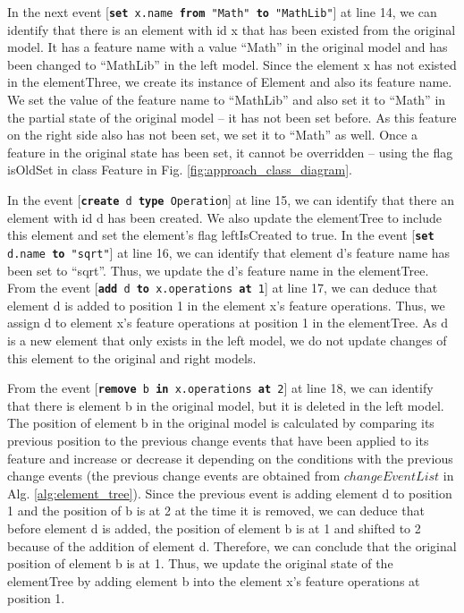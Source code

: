 \documentclass{jot}
\begin{document}
In the next event [\texttt{\small \textbf{set} x.name \textbf{from} "Math" \textbf{to} "MathLib"}] at line 14, we can identify that there is an element with id \textsf{x} that has been existed from the original model. It has a feature \textsf{name} with a value ``Math'' in the original model and has been changed to ``MathLib'' in the left model. Since the element \textsf{x} has not existed in the \textsf{elementThree}, we create its instance of \textsf{Element} and also its feature \textsf{name}. We set the value of the feature \textsf{name} to ``MathLib'' and also set it to ``Math'' in the partial state of the original model -- it has not been set before. As this feature on the right side also has not been set, we set it to ``Math'' as well. Once a feature in the original state has been set, it cannot be overridden -- using the flag \textsf{isOldSet} in class \textsf{Feature} in Fig. \ref{fig:approach_class_diagram}. 

In the event [\texttt{\small \textbf{create} d \textbf{type} Operation}] at line 15, we can identify that there an element with id \textsf{d} has been created. We also update the \textsf{elementTree} to include this element and set the element's flag \textsf{leftIsCreated} to \textsf{true}. In the event [\texttt{\small \textbf{set} d.name \textbf{to} "sqrt"}] at line 16, we can identify that element \textsf{d}'s feature \textsf{name} has been set to ``sqrt''. Thus, we update the \textsf{d}'s feature \textsf{name} in the \textsf{elementTree}. From the event [\texttt{\small \textbf{add} d \textbf{to} x.operations \textbf{at} 1}] at line 17, we can deduce that element \textsf{d} is added to position 1 in the element \textsf{x}'s feature \textsf{operations}. Thus, we assign \textsf{d} to element \textsf{x}'s feature \textsf{operations} at position 1 in the \textsf{elementTree}. As \textsf{d} is a new element that only exists in the left model, we do not update changes of this element to the original and right models. 

From the event [\texttt{\small \textbf{remove} b \textbf{in} x.operations \textbf{at} 2}] at line 18, we can identify that there is element \textsf{b} in the original model, but it is deleted in the left model. The position of element \textsf{b} in the original model is calculated by comparing its previous position to the previous change events that have been applied to its feature and increase or decrease it depending on the conditions with the previous change events (the previous change events are obtained from $changeEventList$ in Alg. \ref{alg:element_tree}). Since the previous event is adding element \textsf{d} to position 1 and the position of \textsf{b} is at 2 at the time it is removed, we can deduce that before element \textsf{d} is added, the position of element \textsf{b} is at 1 and shifted to 2 because of the addition of element \textsf{d}.  Therefore, we can conclude that the original position of element \textsf{b} is at 1. Thus, we update the original state of the \textsf{elementTree} by adding element \textsf{b} into the element \textsf{x}'s feature \textsf{operations} at position 1.  
\end{document}
